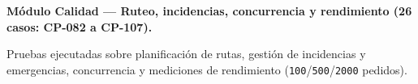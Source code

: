 \par\medskip\noindent\textbf{Módulo Calidad --- Ruteo, incidencias, concurrencia y rendimiento (26 casos: CP-082 a CP-107).}\par\smallskip
Pruebas ejecutadas sobre planificación de rutas, gestión de incidencias y emergencias, concurrencia y mediciones de rendimiento (\texttt{100}/\texttt{500}/\texttt{2000} pedidos).

